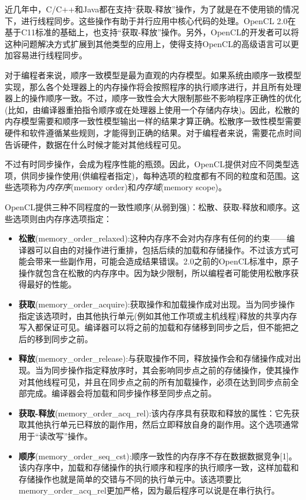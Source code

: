 近几年中，C/C++和Java都在支持“获取-释放”操作，为了就是在不使用锁的情况下，进行线程同步。这些操作有助于并行应用中核心代码的处理。OpenCL 2.0在基于C11标准的基础上，也支持“获取-释放”操作。另外，OpenCL的开发者可以将这种问题解决方式扩展到其他类型的应用上，使得支持OpenCL的高级语言可以更加容易进行线程同步。

对于编程者来说，顺序一致模型是最为直观的内存模型。如果系统由顺序一致模型实现，那么各个处理器上的内存操作将会按照程序的执行顺序进行，并且所有处理器上的操作顺序一致。不过，顺序一致性会大大限制那些不影响程序正确性的优化(比如，由编译器重拍指令顺序或在处理器上使用一个存储内存块)。因此，松散的内存模型需要和顺序一致性模型输出一样的结果才算正确。松散序一致性模型需要硬件和软件遵循某些规则，才能得到正确的结果。对于编程者来说，需要花点时间告诉硬件，数据在什么时候才能对其他线程可见。

不过有时同步操作，会成为程序性能的瓶颈。因此，OpenCL提供对应不同类型选项，供同步操作使用(供编程者指定)，每种选项的粒度都有不同的粒度和范围。这些选项称为\emph{内存序}(memory order)和\emph{内存域}(memory scope)。

OpenCL提供三种不同程度的一致性顺序(从弱到强)：松散、获取-释放和顺序。这些选项则由内存序选项指定：

\begin{itemize}
\item \textbf{松散}(memory\_\allowbreak{}order\_\allowbreak{}relaxed):这种内存序不会对内存序有任何的约束——编译器可以自由的对操作进行重排，包括后续的加载和存储操作。不过该方式可能会带来一些副作用，可能会造成结果错误。2.0之前的OpenCL标准中，原子操作就包含在松散的内存序中。因为缺少限制，所以编程者可能使用松散序获得最好的性能。
\item \textbf{获取}(memory\_\allowbreak{}order\_\allowbreak{}acquire):获取操作和加载操作成对出现。当为同步操作指定该选项时，由其他执行单元(例如其他工作项或主机线程)释放的共享内存写入都保证可见。编译器可以将之前的加载和存储移到同步之后，但不能把之后的移到同步之前。
\item \textbf{释放}(memory\_\allowbreak{}order\_\allowbreak{}release):与获取操作不同，释放操作会和存储操作成对出现。当为同步操作指定释放序时，其会影响同步点之前的存储操作，使其操作对其他线程可见，并且在同步点之前的所有加载操作，必须在达到同步点前全部完成。编译器会将加载和同步操作移至同步点之前。
\item \textbf{获取-释放}(memory\_\allowbreak{}order\_\allowbreak{}acq\_\allowbreak{}rel):该内存序具有获取和释放的属性：它先获取其他执行单元已释放的副作用，然后立即释放自身的副作用。这个选项通常用于“读改写”操作。
\item \textbf{顺序}(memory\_\allowbreak{}order\_\allowbreak{}seq\_\allowbreak{}cst):顺序一致性的内存序不存在数据数据竞争[1]。该内存序中，加载和存储操作的执行顺序和程序的执行顺序一致，这样加载和存储操作也就是简单的交错与不同的执行单元中。该选项要比memory\_\allowbreak{}order\_\allowbreak{}acq\_\allowbreak{}rel更加严格，因为最后程序可以说是在串行执行。
\end{itemize}

